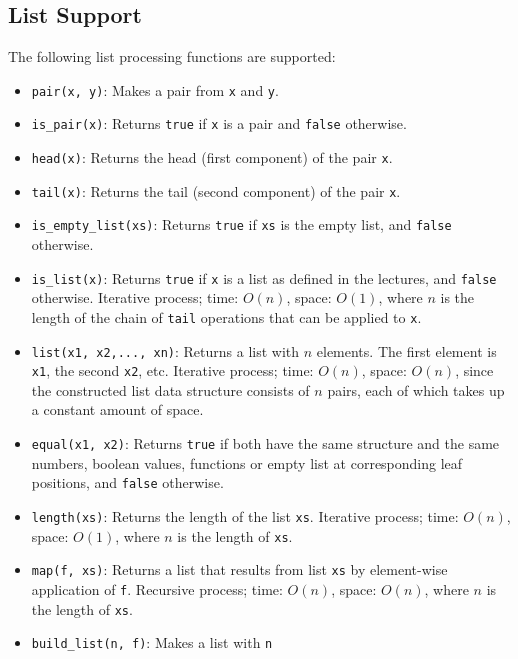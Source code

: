 \subsection*{List Support}

The following list processing functions are supported:

\begin{itemize}
\item \lstinline{pair(x, y)}: Makes a pair from \lstinline{x} and \lstinline{y}.
\item \lstinline{is_pair(x)}: Returns \lstinline{true} if \lstinline{x} is a
  pair and \lstinline{false} otherwise.
\item \lstinline{head(x)}: Returns the head (first component) of the pair \lstinline{x}.
\item \lstinline{tail(x)}: Returns the tail (second component) of the
  pair \lstinline{x}.
\item \lstinline{is_empty_list(xs)}: Returns \lstinline{true} if \lstinline{xs} is the
  empty list, and \lstinline{false} otherwise.
\item \lstinline{is_list(x)}: Returns \lstinline{true} if
  \lstinline{x} is a list as defined in the lectures, and
  \lstinline{false} otherwise. Iterative process; 
time: $O(n)$, space: $O(1)$, where $n$ is the length of the 
chain of \lstinline{tail} operations that can be applied to \lstinline{x}.
\item \lstinline{list(x1, x2,..., xn)}: Returns a list with $n$ elements. The
first element is \lstinline{x1}, the second \lstinline{x2}, etc. Iterative
process; time: $O(n)$, space: $O(n)$, since the constructed list data structure
consists of $n$ pairs, each of which takes up a constant amount of space.
\item \lstinline{equal(x1, x2)}: Returns \lstinline{true} if both
have the same structure and the same numbers, boolean values, functions or empty list
at corresponding leaf positions, and \lstinline{false} otherwise.
\item \lstinline{length(xs)}: Returns the length of the list
  \lstinline{xs}. 
Iterative process; time: $O(n)$, space: $O(1)$, where $n$ is the length of \lstinline{xs}.
\item \lstinline{map(f, xs)}: Returns a list that results from list
  \lstinline{xs} by element-wise application of \lstinline{f}. 
Recursive process; time: $O(n)$, space: $O(n)$, where $n$ is the length of \lstinline{xs}.
\item \lstinline{build_list(n, f)}: Makes a list with \lstinline{n}

\end{itemize}
